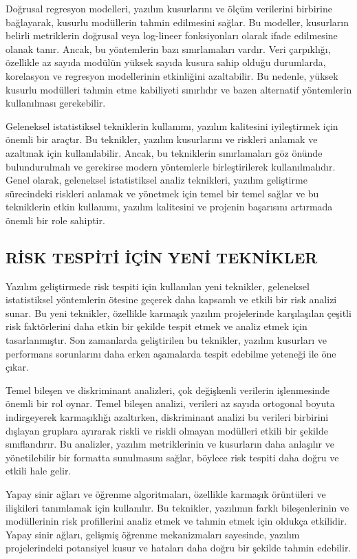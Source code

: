 \documentclass{article}
\begin{document}
Doğrusal regresyon modelleri, yazılım kusurlarını ve ölçüm verilerini birbirine bağlayarak, kusurlu modüllerin tahmin edilmesini sağlar. Bu modeller, kusurların belirli metriklerin doğrusal veya log-lineer fonksiyonları olarak ifade edilmesine olanak tanır. Ancak, bu yöntemlerin bazı sınırlamaları vardır. Veri çarpıklığı, özellikle az sayıda modülün yüksek sayıda kusura sahip olduğu durumlarda, korelasyon ve regresyon modellerinin etkinliğini azaltabilir. Bu nedenle, yüksek kusurlu modülleri tahmin etme kabiliyeti sınırlıdır ve bazen alternatif yöntemlerin kullanılması gerekebilir.

Geleneksel istatistiksel tekniklerin kullanımı, yazılım kalitesini iyileştirmek için önemli bir araçtır. Bu teknikler, yazılım kusurlarını ve riskleri anlamak ve azaltmak için kullanılabilir. Ancak, bu tekniklerin sınırlamaları göz önünde bulundurulmalı ve gerekirse modern yöntemlerle birleştirilerek kullanılmalıdır. Genel olarak, geleneksel istatistiksel analiz teknikleri, yazılım geliştirme sürecindeki riskleri anlamak ve yönetmek için temel bir temel sağlar ve bu tekniklerin etkin kullanımı, yazılım kalitesini ve projenin başarısını artırmada önemli bir role sahiptir.


\subsection{RİSK TESPİTİ İÇİN YENİ TEKNİKLER}

Yazılım geliştirmede risk tespiti için kullanılan yeni teknikler, geleneksel istatistiksel yöntemlerin ötesine geçerek daha kapsamlı ve etkili bir risk analizi sunar. Bu yeni teknikler, özellikle karmaşık yazılım projelerinde karşılaşılan çeşitli risk faktörlerini daha etkin bir şekilde tespit etmek ve analiz etmek için tasarlanmıştır. Son zamanlarda geliştirilen bu teknikler, yazılım kusurları ve performans sorunlarını daha erken aşamalarda tespit edebilme yeteneği ile öne çıkar.

Temel bileşen ve diskriminant analizleri, çok değişkenli verilerin işlenmesinde önemli bir rol oynar. Temel bileşen analizi, verileri az sayıda ortogonal boyuta indirgeyerek karmaşıklığı azaltırken, diskriminant analizi bu verileri birbirini dışlayan gruplara ayırarak riskli ve riskli olmayan modülleri etkili bir şekilde sınıflandırır. Bu analizler, yazılım metriklerinin ve kusurların daha anlaşılır ve yönetilebilir bir formatta sunulmasını sağlar, böylece risk tespiti daha doğru ve etkili hale gelir.

Yapay sinir ağları ve öğrenme algoritmaları, özellikle karmaşık örüntüleri ve ilişkileri tanımlamak için kullanılır. Bu teknikler, yazılımın farklı bileşenlerinin ve modüllerinin risk profillerini analiz etmek ve tahmin etmek için oldukça etkilidir. Yapay sinir ağları, gelişmiş öğrenme mekanizmaları sayesinde, yazılım projelerindeki potansiyel kusur ve hataları daha doğru bir şekilde tahmin edebilir.
\end{document}
